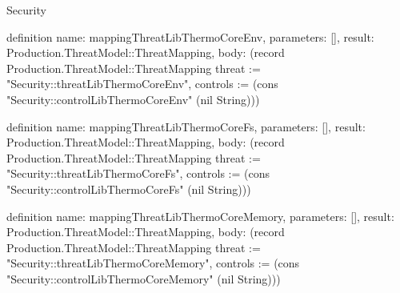 \begin{lexlean}{Security}
\begin{semanticmodule}
definition{
  name: mappingThreatLibThermoCoreEnv,
  parameters: [],
  result: Production.ThreatModel::ThreatMapping,
  body: (record Production.ThreatModel::ThreatMapping {threat := "Security::threatLibThermoCoreEnv", controls := (cons "Security::controlLibThermoCoreEnv" (nil String))})
}

definition{
  name: mappingThreatLibThermoCoreFs,
  parameters: [],
  result: Production.ThreatModel::ThreatMapping,
  body: (record Production.ThreatModel::ThreatMapping {threat := "Security::threatLibThermoCoreFs", controls := (cons "Security::controlLibThermoCoreFs" (nil String))})
}

definition{
  name: mappingThreatLibThermoCoreMemory,
  parameters: [],
  result: Production.ThreatModel::ThreatMapping,
  body: (record Production.ThreatModel::ThreatMapping {threat := "Security::threatLibThermoCoreMemory", controls := (cons "Security::controlLibThermoCoreMemory" (nil String))})
}
\end{semanticmodule}
\end{lexlean}
